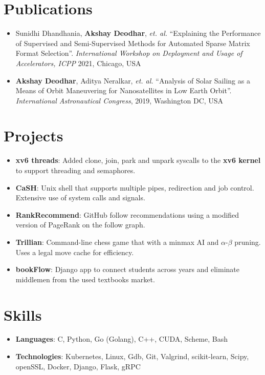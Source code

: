 \documentclass[letterpaper,11pt]{article}
\newcommand{\resumeItem}[1]{
  \item\small{
    {#1 \vspace{-2pt}}
  }
}
\newcommand{\resumeProjItem}[2]{
  \item\small{
    \textbf{#1}{: #2 \vspace{-2pt}}
  }
}
\newcommand{\resumeSubItem}[2]{\resumeProjItem{#1}{#2}\vspace{-4pt}}
\newcommand{\resumeSubHeadingListStart}{\begin{itemize}[leftmargin=*]}
\newcommand{\resumeSubHeadingListEnd}{\end{itemize}}
\newcommand{\resumeItemListEnd}{\end{itemize}\vspace{-5pt}}
\begin{document}
\vspace{-7pt}
  
\section{Publications}
    \resumeSubHeadingListStart
        \resumeItem{}{Sunidhi Dhandhania, \textbf{Akshay Deodhar}, \textit{et. al.} ``Explaining the Performance of Supervised and Semi-Supervised Methods for Automated Sparse Matrix Format Selection''. \textit{International Workshop on Deployment and Usage of Accelerators, ICPP} 2021, Chicago, USA}
        \vspace{-5pt}
        \resumeItem{}{\textbf{Akshay Deodhar}, Aditya Neralkar, \textit{et. al.}  ``Analysis of Solar Sailing as a Means of Orbit Maneuvering for Nanosatellites in Low Earth Orbit''. \textit{International Astronautical Congress}, 2019, Washington DC, USA}
        
        \resumeItemListEnd

\vspace{-7pt}

\section{Projects}
  \resumeSubHeadingListStart
    \resumeSubItem{xv6 threads}{Added clone, join, park and unpark syscalls to the \textbf{xv6 kernel} to support threading and semaphores.}
    \resumeSubItem{CaSH}{Unix shell that supports multiple pipes, redirection and job control. Extensive use of system calls and signals.}
    \resumeSubItem{RankRecommend}{GitHub follow recommendations using a modified version of PageRank on the follow graph.}
    \resumeSubItem{Trillian}{Command-line chess game that with a minmax AI and $\alpha$-$\beta$ pruning. Uses a legal move cache for efficiency.}
    \resumeSubItem{bookFlow}{Django app to connect students across years and eliminate middlemen from the used textbooks market.}
\resumeSubHeadingListEnd

\vspace{-7pt}
\section{Skills}
  \resumeSubHeadingListStart
    \resumeSubItem{Languages}{C, Python, Go (Golang), C++, CUDA, Scheme, Bash}
    \resumeSubItem{Technologies}{Kubernetes, Linux, Gdb, Git, Valgrind, scikit-learn, Scipy, openSSL, Docker, Django, Flask, gRPC}
    \resumeSubHeadingListEnd



\end{document}
